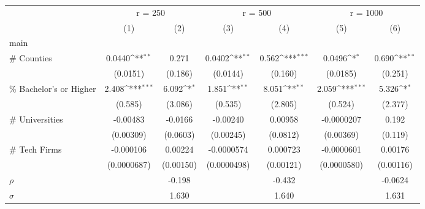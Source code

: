 {
\def\sym#1{\ifmmode^{#1}\else\(^{#1}\)\fi}
\begin{tabular}{l*{6}{c}}
\toprule
                    &\multicolumn{2}{c}{r = 250}                &\multicolumn{2}{c}{r = 500}                &\multicolumn{2}{c}{r = 1000}               \\
                    &\multicolumn{1}{c}{(1)}         &\multicolumn{1}{c}{(2)}         &\multicolumn{1}{c}{(3)}         &\multicolumn{1}{c}{(4)}         &\multicolumn{1}{c}{(5)}         &\multicolumn{1}{c}{(6)}         \\
\midrule
main                &                     &                     &                     &                     &                     &                     \\
\# Counties         &      0.0440\sym{**} &       0.271         &      0.0402\sym{**} &       0.562\sym{***}&      0.0496\sym{*}  &       0.690\sym{**} \\
                    &    (0.0151)         &     (0.186)         &    (0.0144)         &     (0.160)         &    (0.0185)         &     (0.251)         \\
\addlinespace
\% Bachelor's or Higher&       2.408\sym{***}&       6.092\sym{*}  &       1.851\sym{**} &       8.051\sym{**} &       2.059\sym{***}&       5.326\sym{*}  \\
                    &     (0.585)         &     (3.086)         &     (0.535)         &     (2.805)         &     (0.524)         &     (2.377)         \\
\addlinespace
\# Universities     &    -0.00483         &     -0.0166         &    -0.00240         &     0.00958         &  -0.0000207         &       0.192         \\
                    &   (0.00309)         &    (0.0603)         &   (0.00245)         &    (0.0812)         &   (0.00369)         &     (0.119)         \\
\addlinespace
\# Tech Firms       &   -0.000106         &     0.00224         &  -0.0000574         &    0.000723         &  -0.0000601         &     0.00176         \\
                    & (0.0000687)         &   (0.00150)         & (0.0000498)         &   (0.00121)         & (0.0000580)         &   (0.00116)         \\
\midrule
\(\rho\)            &                     &      -0.198         &                     &      -0.432         &                     &     -0.0624         \\
\(\sigma\)          &                     &       1.630         &                     &       1.640         &                     &       1.631         \\

\end{tabular}}
